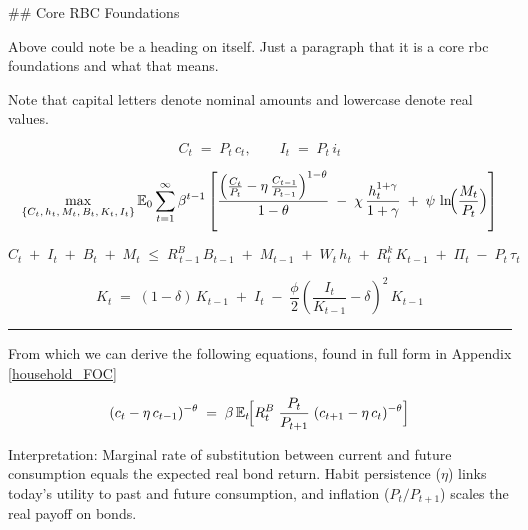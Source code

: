 \documentclass[11pt,preprint]{elsarticle}
\numberwithin{equation}{section}
\numberwithin{figure}{section}
\numberwithin{table}{section}
\begin{document}
\#\# Core RBC Foundations

Above could note be a heading on itself. Just a paragraph that it is a
core rbc foundations and what that means.

Note that capital letters denote nominal amounts and lowercase denote
real values.

\begin{equation}
C_t \;=\; P_t \, c_t,
\qquad
I_t \;=\; P_t \, i_t
\label{nominal_definitions}
\end{equation}

\begin{equation}
\max_{\{C_t,\,h_t,\,M_t,\,B_t,\,K_t,\,I_t\}}
\mathbb{E}_0 \sum_{t=1}^{\infty} \beta^{t-1}
\left[
\frac{\Bigl(\frac{C_t}{P_t} - \eta\,\frac{C_{t-1}}{P_{t-1}}\Bigr)^{1-\theta}}{1-\theta}
\;-\;\chi\,\frac{h_t^{1+\gamma}}{1+\gamma}
\;+\;\psi\,\ln\!\Bigl(\frac{M_t}{P_t}\Bigr)
\right]
\label{lifetime_utility_nominal}
\end{equation}

\begin{equation}
C_t \;+\; I_t \;+\; B_t \;+\; M_t
\;\le\;
R^B_{\,t-1}\,B_{t-1}
\;+\; M_{t-1}
\;+\; W_t\,h_t
\;+\; R^k_t\,K_{t-1}
\;+\; \Pi_t
\;-\; P_t\,\tau_t
\label{flow_constraint_nominal}
\end{equation}

\begin{equation}
K_t
\;=\;
(1 - \delta)\,K_{t-1}
\;+\; I_t
\;-\;\frac{\phi}{2}
\left(\frac{I_t}{K_{t-1}} - \delta\right)^{2}
\,K_{t-1}
\label{capital_accumulation_nominal}
\end{equation}

\begin{center}\rule{0.5\linewidth}{0.5pt}\end{center}

From which we can derive the following equations, found in full form in
Appendix \ref{household_FOC}

\begin{equation}\label{consEuler}
  (c_t - \eta\,c_{t-1})^{-\theta}
  \;=\;
  \beta\,\mathbb{E}_t\!\Bigl[
    R_t^B \;\frac{P_t}{P_{t+1}}\;(c_{t+1} - \eta\,c_t)^{-\theta}
  \Bigr]
\end{equation}

Interpretation: Marginal rate of substitution between current and future
consumption equals the expected real bond return. Habit persistence
(\(\eta\)) links today's utility to past and future consumption, and
inflation (\(P_t/P_{t+1}\)) scales the real payoff on bonds.
\end{document}
